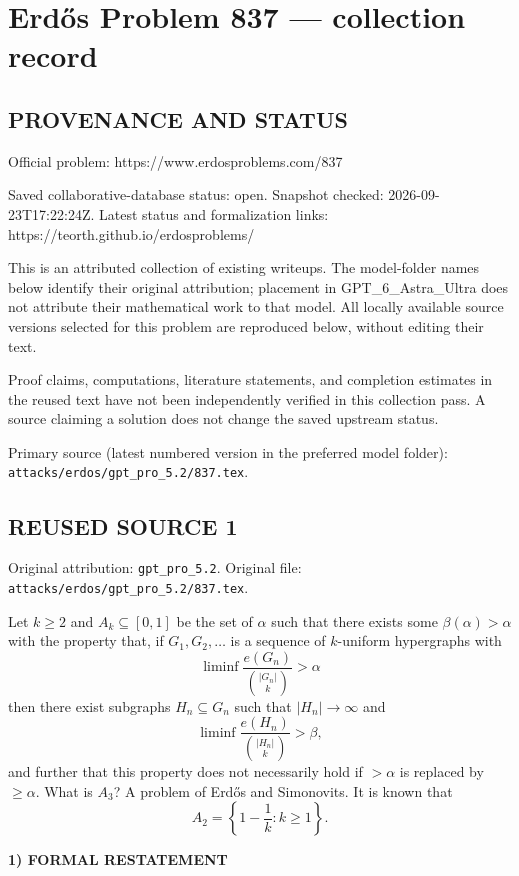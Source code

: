 \section*{Erd\H{o}s Problem 837 --- collection record}

\subsection*{PROVENANCE AND STATUS}
Official problem: https://www.erdosproblems.com/837

Saved collaborative-database status: open.
Snapshot checked: 2026-09-23T17:22:24Z.
Latest status and formalization links: https://teorth.github.io/erdosproblems/

This is an attributed collection of existing writeups. The model-folder names below identify their original attribution; placement in GPT\_6\_Astra\_Ultra does not attribute their mathematical work to that model. All locally available source versions selected for this problem are reproduced below, without editing their text.

Proof claims, computations, literature statements, and completion estimates in the reused text have not been independently verified in this collection pass. A source claiming a solution does not change the saved upstream status.

Primary source (latest numbered version in the preferred model folder): \texttt{attacks/erdos/gpt\_pro\_5.2/837.tex}.

\subsection*{REUSED SOURCE 1}
Original attribution: \texttt{gpt\_pro\_5.2}.
Original file: \texttt{attacks/erdos/gpt\_pro\_5.2/837.tex}.


Let $k\geq 2$ and $A_k\subseteq [0,1]$ be the set of $\alpha$ such that there exists some $\beta(\alpha)>\alpha$ with the property that, if $G_1,G_2,\ldots$ is a sequence of $k$-uniform hypergraphs with\[\liminf \frac{e(G_n)}{\binom{\lvert G_n\rvert}{k}} >\alpha\]then there exist subgraphs $H_n\subseteq G_n$ such that $\lvert H_n\rvert \to \infty$ and\[\liminf \frac{e(H_n)}{\binom{\lvert H_n\rvert}{k}} >\beta,\]and further that this property does not necessarily hold if $>\alpha$ is replaced by $\geq \alpha$. What is $A_3$? A problem of Erd\H{o}s and Simonovits. It is known that\[A_2 = \left\{ 1-\frac{1}{k} : k\geq 1\right\}.\]

\medskip
\noindent\textbf{1) FORMAL RESTATEMENT}

